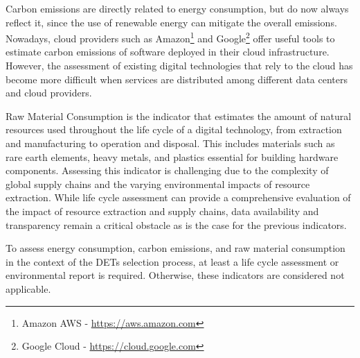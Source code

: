 Carbon emissions are directly related to energy consumption, but do now always reflect it, since the use of renewable energy can mitigate the overall emissions. Nowadays, cloud providers such as Amazon\footnote{Amazon AWS - \href{https://aws.amazon.com/it/aws-cost-management/aws-customer-carbon-footprint-tool/}{https://aws.amazon.com}} and Google\footnote{Google Cloud - \href{https://cloud.google.com/carbon-footprint}{https://cloud.google.com}} offer useful tools to estimate carbon emissions of software deployed in their cloud infrastructure. However, the assessment of existing digital technologies that rely to the cloud has become more difficult when services are distributed among different data centers and cloud providers.

Raw Material Consumption is the indicator that estimates the amount of natural resources used throughout the life cycle of a digital technology, from extraction and manufacturing to operation and disposal. This includes materials such as rare earth elements, heavy metals, and plastics essential for building hardware components\cite{saldana-duran_e-waste_2021}. Assessing this indicator is challenging due to the complexity of global supply chains and the varying environmental impacts of resource extraction. While life cycle assessment can provide a comprehensive evaluation of the impact of resource extraction and supply chains, data availability and transparency remain a critical obstacle as is the case for the previous indicators.

To assess energy consumption, carbon emissions, and raw material consumption in the context of the DETs selection process, at least a life cycle assessment or environmental report is required. Otherwise, these indicators are considered not applicable.

